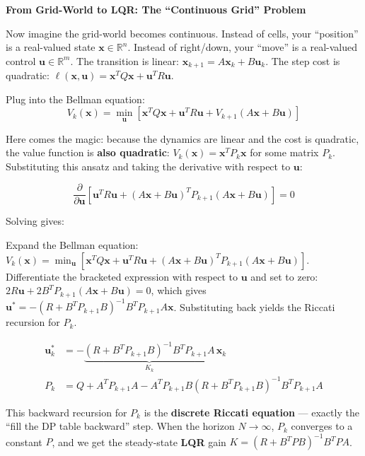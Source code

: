\vspace{0.5em}
\begin{mdframed}[linewidth=1pt, innertopmargin=10pt, innerbottommargin=10pt]
\textbf{From Grid-World to LQR: The ``Continuous Grid'' Problem}

\vspace{0.3em}
Now imagine the grid-world becomes continuous. Instead of cells, your ``position'' is a real-valued state $\mathbf{x} \in \mathbb{R}^n$. Instead of right/down, your ``move'' is a real-valued control $\mathbf{u} \in \mathbb{R}^m$. The transition is linear: $\mathbf{x}_{k+1} = A\mathbf{x}_k + B\mathbf{u}_k$. The step cost is quadratic: $\ell(\mathbf{x}, \mathbf{u}) = \mathbf{x}^T Q \mathbf{x} + \mathbf{u}^T R \mathbf{u}$.

Plug into the Bellman equation:
\[
V_k(\mathbf{x}) = \min_{\mathbf{u}} \left[ \mathbf{x}^T Q \mathbf{x} + \mathbf{u}^T R \mathbf{u} + V_{k+1}(A\mathbf{x} + B\mathbf{u}) \right]
\]

Here comes the magic: because the dynamics are linear and the cost is quadratic, the value function is \textbf{also quadratic}: $V_k(\mathbf{x}) = \mathbf{x}^T P_k \mathbf{x}$ for some matrix $P_k$. Substituting this ansatz and taking the derivative with respect to $\mathbf{u}$:

\[
\frac{\partial}{\partial \mathbf{u}} \left[ \mathbf{u}^T R \mathbf{u} + (A\mathbf{x} + B\mathbf{u})^T P_{k+1} (A\mathbf{x} + B\mathbf{u}) \right] = 0
\]

Solving gives:

Expand the Bellman equation: $V_k(\mathbf{x}) = \min_{\mathbf{u}}[\mathbf{x}^T Q \mathbf{x} + \mathbf{u}^T R \mathbf{u} + (A\mathbf{x}+B\mathbf{u})^T P_{k+1}(A\mathbf{x}+B\mathbf{u})]$. Differentiate the bracketed expression with respect to $\mathbf{u}$ and set to zero: $2R\mathbf{u} + 2B^T P_{k+1}(A\mathbf{x} + B\mathbf{u}) = 0$, which gives $\mathbf{u}^* = -(R + B^T P_{k+1} B)^{-1} B^T P_{k+1} A \mathbf{x}$. Substituting back yields the Riccati recursion for $P_k$.

\begin{align}
\mathbf{u}_k^* &= -\underbrace{(R + B^T P_{k+1} B)^{-1} B^T P_{k+1} A}_{K_k} \, \mathbf{x}_k \\
P_k &= Q + A^T P_{k+1} A - A^T P_{k+1} B (R + B^T P_{k+1} B)^{-1} B^T P_{k+1} A
\end{align}

This backward recursion for $P_k$ is the \textbf{discrete Riccati equation} --- exactly the ``fill the DP table backward'' step. When the horizon $N \to \infty$, $P_k$ converges to a constant $P$, and we get the steady-state \textbf{LQR} gain $K = (R + B^T P B)^{-1} B^T P A$.


\end{mdframed}

